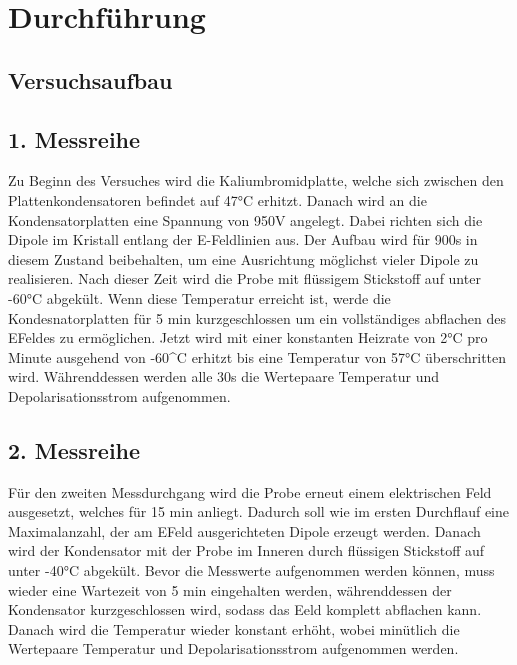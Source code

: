 \section{Durchführung}
\label{sec:Durchführung}

\subsection{Versuchsaufbau}


\subsection{1. Messreihe}

Zu Beginn des Versuches wird die Kaliumbromidplatte, welche sich zwischen den 
Plattenkondensatoren befindet auf 47°C erhitzt.
Danach wird an die Kondensatorplatten eine Spannung von 950V angelegt. 
Dabei richten sich die Dipole im Kristall entlang der E-Feldlinien aus.
Der Aufbau wird für 900s in diesem Zustand beibehalten, um eine 
Ausrichtung möglichst vieler Dipole zu realisieren.
Nach dieser Zeit wird die Probe mit flüssigem Stickstoff auf unter -60°C abgekült.
Wenn diese Temperatur erreicht ist, werde die Kondesnatorplatten für 5 min kurzgeschlossen
um ein vollständiges abflachen des EFeldes zu ermöglichen.
Jetzt wird mit einer konstanten Heizrate von 2°C pro Minute ausgehend von 
-60^C erhitzt bis eine Temperatur von 57°C überschritten wird. 
Währenddessen werden alle 30s die Wertepaare Temperatur und Depolarisationsstrom 
aufgenommen.


\subsection{2. Messreihe}

Für den zweiten Messdurchgang wird die Probe erneut einem elektrischen Feld ausgesetzt,
welches für 15 min anliegt. Dadurch soll wie im ersten Durchflauf eine Maximalanzahl,
der am EFeld ausgerichteten Dipole erzeugt werden.
Danach wird der Kondensator mit der Probe im Inneren durch flüssigen Stickstoff auf 
unter -40°C abgekült. Bevor die Messwerte aufgenommen werden können, muss wieder 
eine Wartezeit von 5 min eingehalten werden, währenddessen der Kondensator 
kurzgeschlossen wird, sodass das Eeld komplett abflachen kann.
Danach wird die Temperatur wieder konstant erhöht, wobei minütlich die Wertepaare
Temperatur und Depolarisationsstrom aufgenommen werden.